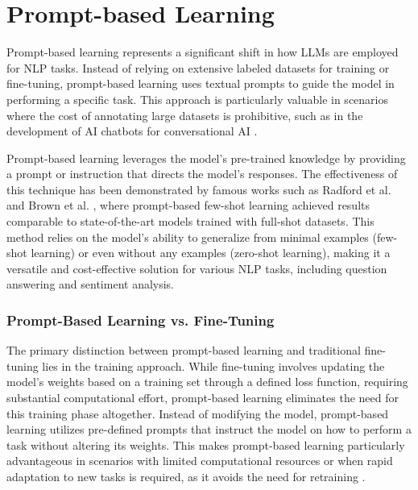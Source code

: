 \section{Prompt-based Learning}

Prompt-based learning represents a significant shift in how LLMs are employed for NLP tasks. Instead of relying on extensive labeled datasets for training or fine-tuning, prompt-based learning uses textual prompts to guide the model in performing a specific task. This approach is particularly valuable in scenarios where the cost of annotating large datasets is prohibitive, such as in the development of AI chatbots for conversational AI \cite{madotto2021few}.

Prompt-based learning leverages the model's pre-trained knowledge by providing a prompt or instruction that directs the model's responses. The effectiveness of this technique has been demonstrated by famous works such as Radford et al. \cite{radford2019language} and Brown et al. \cite{brown2020language}, where prompt-based few-shot learning achieved results comparable to state-of-the-art models trained with full-shot datasets. This method relies on the model's ability to generalize from minimal examples (few-shot learning) or even without any examples (zero-shot learning), making it a versatile and cost-effective solution for various NLP tasks, including question answering and sentiment analysis.

\subsubsection{Prompt-Based Learning vs. Fine-Tuning}

The primary distinction between prompt-based learning and traditional fine-tuning lies in the training approach. While fine-tuning involves updating the model's weights based on a training set through a defined loss function, requiring substantial computational effort, prompt-based learning eliminates the need for this training phase altogether. Instead of modifying the model, prompt-based learning utilizes pre-defined prompts that instruct the model on how to perform a task without altering its weights. This makes prompt-based learning particularly advantageous in scenarios with limited computational resources or when rapid adaptation to new tasks is required, as it avoids the need for retraining \cite{madotto2021few}. 

